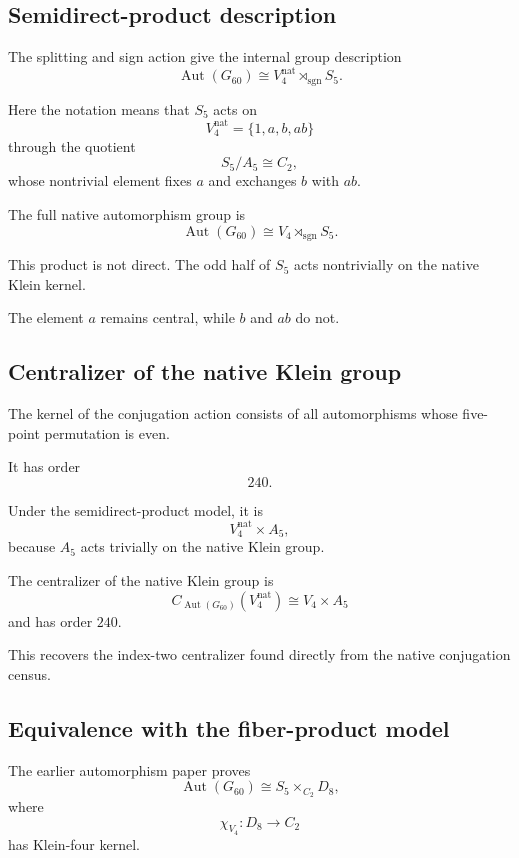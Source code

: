 \subsection{Semidirect-product description}

The splitting and sign action give the internal group description
\[
\operatorname{Aut}(G_{60})
\cong
V_4^{\mathrm{nat}}\rtimes_{\operatorname{sgn}}S_5.
\]

Here the notation means that \(S_5\) acts on
\[
V_4^{\mathrm{nat}}=\{1,a,b,ab\}
\]
through the quotient
\[
S_5/A_5\cong C_2,
\]
whose nontrivial element fixes \(a\) and exchanges \(b\) with \(ab\).

\begin{theorem}
The full native automorphism group is
\[
\boxed{
\operatorname{Aut}(G_{60})
\cong
V_4\rtimes_{\operatorname{sgn}}S_5.
}
\]
\end{theorem}

This product is not direct. The odd half of \(S_5\) acts nontrivially
on the native Klein kernel.

The element \(a\) remains central, while \(b\) and \(ab\) do not.

\subsection{Centralizer of the native Klein group}

The kernel of the conjugation action consists of all automorphisms
whose five-point permutation is even.

It has order
\[
240.
\]

Under the semidirect-product model, it is
\[
V_4^{\mathrm{nat}}\times A_5,
\]
because \(A_5\) acts trivially on the native Klein group.

\begin{corollary}
The centralizer of the native Klein group is
\[
C_{\operatorname{Aut}(G_{60})}(V_4^{\mathrm{nat}})
\cong
V_4\times A_5
\]
and has order \(240\).
\end{corollary}

This recovers the index-two centralizer found directly from the native
conjugation census.

\subsection{Equivalence with the fiber-product model}

The earlier automorphism paper proves
\[
\operatorname{Aut}(G_{60})
\cong
S_5\times_{C_2}D_8,
\]
where
\[
\chi_{V_4}:D_8\longrightarrow C_2
\]
has Klein-four kernel.


